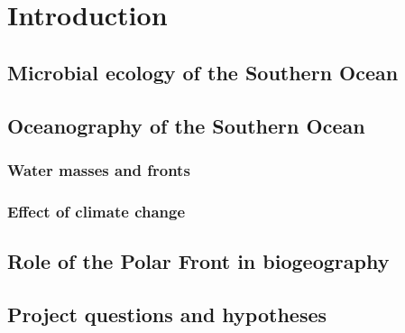 \chapter{Introduction} 
\label{ch:intro}

\section{Microbial ecology of the Southern Ocean}

\section{Oceanography of the Southern Ocean}
\subsection{Water masses and fronts}
\subsection{Effect of climate change}

\section{Role of the Polar Front in biogeography}
\section{Project questions and hypotheses}
